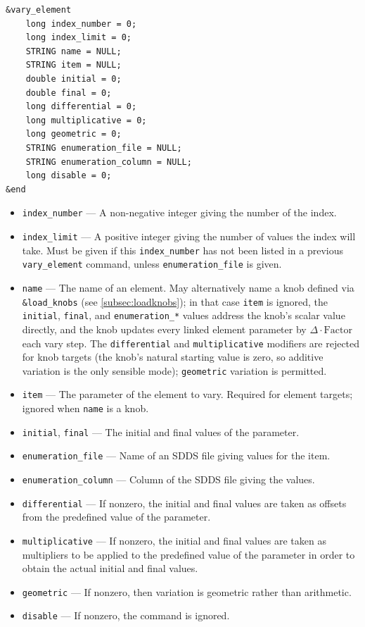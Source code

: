 \documentclass[11pt]{article}
\begin{document}
\begin{verbatim}
&vary_element
    long index_number = 0;
    long index_limit = 0;
    STRING name = NULL;
    STRING item = NULL;
    double initial = 0;
    double final = 0;
    long differential = 0;
    long multiplicative = 0;
    long geometric = 0;
    STRING enumeration_file = NULL;
    STRING enumeration_column = NULL;
    long disable = 0;
&end
\end{verbatim}

\begin{itemize}
\item \verb|index_number| --- A non-negative integer giving the number of the index.
\item \verb|index_limit| --- A positive integer giving the number of values the index will take.
 Must be given if this \verb|index_number| has not been listed in a previous \verb|vary_element|
command, unless \verb|enumeration_file| is given.
\item \verb|name| --- The name of an element.  May alternatively name a knob defined via
 \verb|&load_knobs| (see \ref{subsec:loadknobs}); in that case \verb|item| is ignored, the
 \verb|initial|, \verb|final|, and \verb|enumeration_*| values address the knob's scalar value
 directly, and the knob updates every linked element parameter by $\Delta\cdot\textrm{Factor}$
 each vary step.  The \verb|differential| and \verb|multiplicative| modifiers are rejected for
 knob targets (the knob's natural starting value is zero, so additive variation is the only
 sensible mode); \verb|geometric| variation is permitted.
\item \verb|item| --- The parameter of the element to vary.  Required for element targets;
 ignored when \verb|name| is a knob.
\item \verb|initial|, \verb|final| --- The initial and final values of the parameter.
\item \verb|enumeration_file| --- Name of an SDDS file giving values for the item.
\item \verb|enumeration_column| --- Column of the SDDS file giving the values.
\item \verb|differential| --- If nonzero, the initial and final values are taken as
offsets from the predefined value of the parameter.
\item \verb|multiplicative| --- If nonzero, the initial and final values are taken as 
multipliers to be applied to the predefined value of the parameter in order to obtain
the actual initial and final values.
\item \verb|geometric| --- If nonzero, then variation is geometric rather than 
arithmetic.
\item \verb|disable| --- If nonzero, the command is ignored.
\end{itemize}
\end{document}
